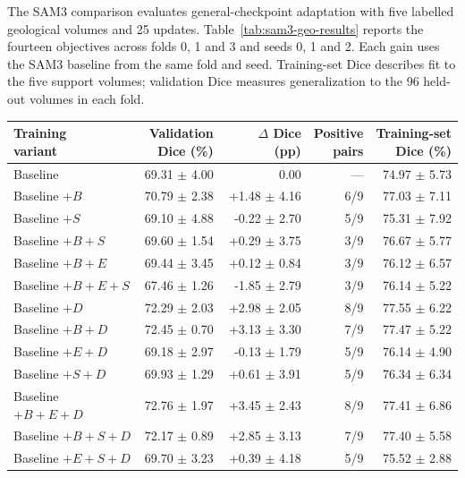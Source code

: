 \documentclass[12pt,a4paper]{article}
\begin{document}
The SAM3 comparison evaluates general-checkpoint adaptation with five
labelled geological volumes and 25 updates. Table~\ref{tab:sam3-geo-results}
reports the fourteen objectives across folds 0, 1 and 3 and seeds 0, 1
and 2. Each gain uses the SAM3 baseline from the same fold and seed.
Training-set Dice describes fit to the five support volumes; validation
Dice measures generalization to the 96 held-out volumes in each fold.

\begin{table}[htbp]
\centering\small{}
\setlength{\tabcolsep}{6pt}
\renewcommand{\arraystretch}{1.12}
\begin{tabular}{@{}lrrrr@{}}
\hline
\shortstack{Training\\variant} & \shortstack{Validation\\Dice (\%)} & \shortstack{$\Delta$ Dice\\(pp)} & \shortstack{Positive\\pairs} & \shortstack{Training-set\\Dice (\%)} \\
\hline
Baseline & 69.31 $\pm$ 4.00 & 0.00 & --- & 74.97 $\pm$ 5.73 \\
Baseline $+B$ & 70.79 $\pm$ 2.38 & +1.48 $\pm$ 4.16 & 6/9 & 77.03 $\pm$ 7.11 \\
Baseline $+S$ & 69.10 $\pm$ 4.88 & -0.22 $\pm$ 2.70 & 5/9 & 75.31 $\pm$ 7.92 \\
Baseline $+B+S$ & 69.60 $\pm$ 1.54 & +0.29 $\pm$ 3.75 & 3/9 & 76.67 $\pm$ 5.77 \\
Baseline $+B+E$ & 69.44 $\pm$ 3.45 & +0.12 $\pm$ 0.84 & 3/9 & 76.12 $\pm$ 6.57 \\
Baseline $+B+E+S$ & 67.46 $\pm$ 1.26 & -1.85 $\pm$ 2.79 & 3/9 & 76.14 $\pm$ 5.22 \\
Baseline $+D$ & 72.29 $\pm$ 2.03 & +2.98 $\pm$ 2.05 & 8/9 & 77.55 $\pm$ 6.22 \\
Baseline $+B+D$ & 72.45 $\pm$ 0.70 & +3.13 $\pm$ 3.30 & 7/9 & 77.47 $\pm$ 5.22 \\
Baseline $+E+D$ & 69.18 $\pm$ 2.97 & -0.13 $\pm$ 1.79 & 5/9 & 76.14 $\pm$ 4.90 \\
Baseline $+S+D$ & 69.93 $\pm$ 1.29 & +0.61 $\pm$ 3.91 & 5/9 & 76.34 $\pm$ 6.34 \\
Baseline $+B+E+D$ & 72.76 $\pm$ 1.97 & +3.45 $\pm$ 2.43 & 8/9 & 77.41 $\pm$ 6.86 \\
Baseline $+B+S+D$ & 72.17 $\pm$ 0.89 & +2.85 $\pm$ 3.13 & 7/9 & 77.40 $\pm$ 5.58 \\
Baseline $+E+S+D$ & 69.70 $\pm$ 3.23 & +0.39 $\pm$ 4.18 & 5/9 & 75.52 $\pm$ 2.88 \\

\end{tabular}
\end{table}
\end{document}
